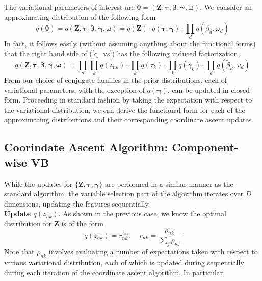 \documentclass[twoside,11pt]{article}
\newcommand{\boldbeta}{\boldsymbol\beta}
\newcommand{\boldgamma}{\boldsymbol\gamma}
\newcommand{\boldtau}{\boldsymbol\tau}
\newcommand{\betad}{\tilde{\beta}_d}
\begin{document}
The variational parameters of interest are $\boldsymbol \theta = \left(\mathbf{Z}, \boldtau, \boldbeta, \boldgamma, \boldsymbol \omega \right)$. We consider an approximating distribution of the following form
\begin{equation} \label{q_vs}
	q(\boldsymbol \theta) = q \left(\mathbf{Z}, \boldtau, \boldbeta, \boldgamma, \boldsymbol \omega \right) = q(\mathbf{Z}) \cdot q(\boldtau, \boldgamma) \cdot \prod_{d} q(\betad, \omega_d)
\end{equation}
In fact, it follows easily (without assuming anything about the functional forms) that the right hand side of  (\ref{q_vs}) has the following induced factorization, 
\begin{equation} \label{q_vs_fact}
	q \left(\mathbf{Z}, \boldtau, \boldbeta, \boldgamma, \boldsymbol \omega \right) =  \prod_{n} \prod_{k} q(z_{nk}) \cdot \prod_{k} q(\tau_k) \cdot \prod_{k} q(\gamma_k) \cdot \prod_{d} q(\betad, \omega_d)
\end{equation}
From our choice of conjugate families in the prior distributions, each of variational parameters, with the exception of $q \left( \boldgamma \right)$, can be updated in closed form. Proceeding in standard fashion by taking the expectation with respect to the variational distribution, we can derive the functional form for each of the approximating distributions and their corresponding coordinate ascent updates. \\



\subsection{Coorindate Ascent Algorithm: Component-wise VB}
While the updates for $\{\mathbf{Z}, \boldtau, \boldgamma \}$ are performed in a similar manner as the standard algorithm. the variable selection part of the algorithm iterates over $D$ dimensions, updating the features sequentially. \\


\textbf{Update $q \left( z_{nk} \right)$}. As shown in the previous case, we know the optimal distribution for $\mathbf{Z}$ is of the form
$$q(z_{nk}) = r_{nk}^{z_{nk}}, \quad r_{nk} = \frac{\rho_{nk}}{\sum_{j} \rho_{nj}}$$ 
Note that $\rho_{nk}$ involves evaluating a number of expectations taken with respect to various variational distribution, each of which is updated during sequentially during each iteration of the coordinate ascent algorithm. In particular, 
\end{document}
